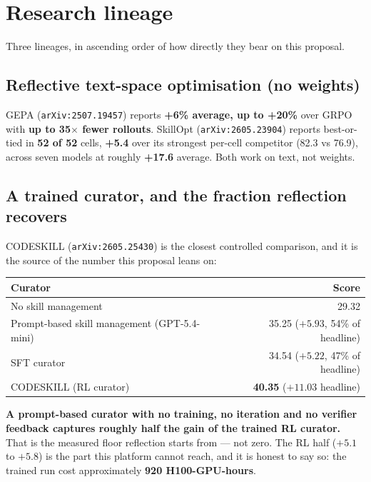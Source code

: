 \documentclass[11pt,a4paper]{article}
\begin{document}
\section{Research lineage}
\label{sec:lineage}

Three lineages, in ascending order of how directly they bear on this proposal.

\subsection{Reflective text-space optimisation (no weights)}

GEPA (\texttt{arXiv:2507.19457}) reports \textbf{+6\% average, up to +20\%} over
GRPO with \textbf{up to 35$\times$ fewer rollouts}. SkillOpt
(\texttt{arXiv:2605.23904}) reports best-or-tied in \textbf{52 of 52} cells,
\textbf{+5.4} over its strongest per-cell competitor (82.3 vs 76.9), across seven
models at roughly \textbf{+17.6} average. Both work on text, not weights.

\subsection{A trained curator, and the fraction reflection recovers}

CODESKILL (\texttt{arXiv:2605.25430}) is the closest controlled comparison, and it
is the source of the number this proposal leans on:

\begin{center}
\begin{tabular}{@{}lr@{}}
\toprule
\textbf{Curator} & \textbf{Score} \\
\midrule
No skill management & 29.32 \\
Prompt-based skill management (GPT-5.4-mini) & 35.25 \quad ($+5.93$, 54\% of headline) \\
SFT curator & 34.54 \quad ($+5.22$, 47\% of headline) \\
CODESKILL (RL curator) & \textbf{40.35} \quad ($+11.03$ headline) \\
\bottomrule
\end{tabular}
\end{center}

\textbf{A prompt-based curator with no training, no iteration and no verifier
feedback captures roughly half the gain of the trained RL curator.} That is the
measured floor reflection starts from --- not zero. The RL half ($+5.1$ to $+5.8$)
is the part this platform cannot reach, and it is honest to say so: the trained run
cost approximately \textbf{920 H100-GPU-hours}.
\end{document}
